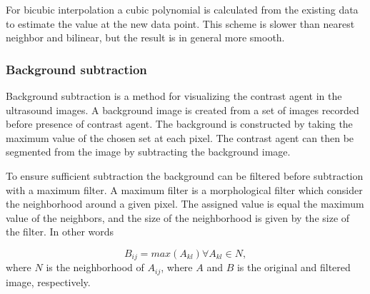 For bicubic interpolation a cubic polynomial is calculated from the existing data to estimate the value at the new data point. This scheme is slower than nearest neighbor and bilinear, but the result is in general more smooth. 

\subsubsection{Background subtraction}
Background subtraction is a method for visualizing the contrast agent in the ultrasound images. A background image is created from a set of images recorded before presence of contrast agent. The background is constructed by taking the maximum value of the chosen set at each pixel. The contrast agent can then be segmented from the image by subtracting the background image. 

To ensure sufficient subtraction the background can be filtered before subtraction with a maximum filter. A maximum filter is a morphological filter which consider the neighborhood around a given pixel. The assigned value is equal the maximum value of the neighbors, and the size of the neighborhood is given by the size of the filter. In other words

\begin{equation}
B_{ij} = max(A_{kl}) \forall A_{kl} \in N,
\end{equation}
where $N$ is the neighborhood of $A_{ij}$, where $A$ and $B$ is the original and filtered image, respectively. 


%
%
%










